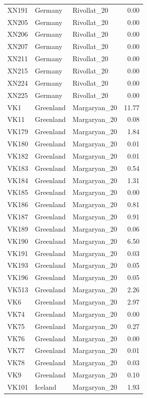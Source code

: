 \begin{longtable}[t]{lllr}
XN191 & Germany & Rivollat\_20 & 0.00\\
XN205 & Germany & Rivollat\_20 & 0.00\\
XN206 & Germany & Rivollat\_20 & 0.00\\
XN207 & Germany & Rivollat\_20 & 0.00\\
XN211 & Germany & Rivollat\_20 & 0.00\\
XN215 & Germany & Rivollat\_20 & 0.00\\
XN224 & Germany & Rivollat\_20 & 0.00\\
XN225 & Germany & Rivollat\_20 & 0.00\\
VK1 & Greenland & Margaryan\_20 & 11.77\\
VK11 & Greenland & Margaryan\_20 & 0.08\\
VK179 & Greenland & Margaryan\_20 & 1.84\\
VK180 & Greenland & Margaryan\_20 & 0.01\\
VK182 & Greenland & Margaryan\_20 & 0.01\\
VK183 & Greenland & Margaryan\_20 & 0.54\\
VK184 & Greenland & Margaryan\_20 & 1.31\\
VK185 & Greenland & Margaryan\_20 & 0.00\\
VK186 & Greenland & Margaryan\_20 & 0.81\\
VK187 & Greenland & Margaryan\_20 & 0.91\\
VK189 & Greenland & Margaryan\_20 & 0.06\\
VK190 & Greenland & Margaryan\_20 & 6.50\\
VK191 & Greenland & Margaryan\_20 & 0.03\\
VK193 & Greenland & Margaryan\_20 & 0.05\\
VK196 & Greenland & Margaryan\_20 & 0.05\\
VK513 & Greenland & Margaryan\_20 & 2.26\\
VK6 & Greenland & Margaryan\_20 & 2.97\\
VK74 & Greenland & Margaryan\_20 & 0.00\\
VK75 & Greenland & Margaryan\_20 & 0.27\\
VK76 & Greenland & Margaryan\_20 & 0.00\\
VK77 & Greenland & Margaryan\_20 & 0.01\\
VK78 & Greenland & Margaryan\_20 & 0.03\\
VK9 & Greenland & Margaryan\_20 & 0.10\\
VK101 & Iceland & Margaryan\_20 & 1.93\\

\end{longtable}
